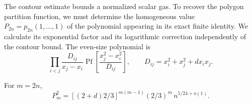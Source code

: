The contour estimate bounds a normalized scalar gas. To recover the
polygon partition function, we must determine the homogeneous value
\(P_{2n}=p_{2n}(1,\ldots,1)\) of the polynomial appearing in its exact
finite identity. We calculate its exponential factor and its logarithmic
correction independently of the contour bound. The even-size polynomial
is
\[
 \prod_{i<j}\frac{D_{ij}}{x_j-x_i}\operatorname{Pf}\left[
 \frac{x_j^2-x_i^2}{D_{ij}}\right],\qquad D_{ij}=x_i^2+x_j^2+d x_i x_j .
\]
\begin{lemma}
\label{c2:lem-pfaffian-normalization}
For \(m=2n\),
\begin{equation}
 P_m^2=[(2+d)2/3]^{m(m-1)}(2/3)^m\, n^{5/24+o(1)}.                   \label{c2:eq-V8}
\end{equation}
\end{lemma}

